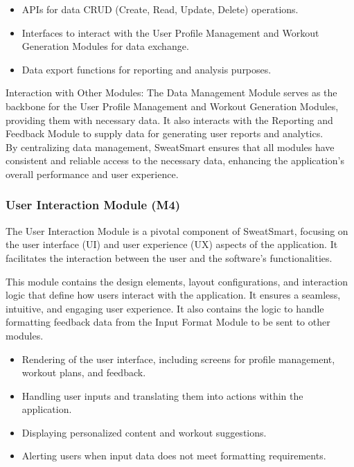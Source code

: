 \documentclass[12pt, titlepage]{article}
\begin{document}
\begin{description}[leftmargin=0pt]
\item[Interfaces:] 
\end{description}
\begin{itemize}[leftmargin=*]
\item APIs for data CRUD (Create, Read, Update, Delete) operations.
\item Interfaces to interact with the User Profile Management and Workout Generation Modules for data exchange.
\item Data export functions for reporting and analysis purposes.
\end{itemize}

Interaction with Other Modules: The Data Management Module serves as the backbone for the User Profile Management and Workout Generation Modules, providing them with necessary data. It also interacts with the Reporting and Feedback Module to supply data for generating user reports and analytics.
\\

By centralizing data management, SweatSmart ensures that all modules have consistent and reliable access to the necessary data, enhancing the application's overall performance and user experience.

\subsubsection{User Interaction Module (M4)}

The User Interaction Module is a pivotal component of SweatSmart, focusing on the user interface (UI) and user experience (UX) aspects of the application. It facilitates the interaction between the user and the software's functionalities.

\begin{description}[leftmargin=0pt]
\item[Secrets:] 
This module contains the design elements, layout configurations, and interaction logic that define how users interact with the application. It ensures a seamless, intuitive, and engaging user experience. It also contains the logic to handle formatting feedback data from the Input Format Module to be sent to other modules.
\end{description}

\begin{description}[leftmargin=0pt]
\item[Services:] 
\end{description}
\begin{itemize}[leftmargin=*]
\item Rendering of the user interface, including screens for profile management, workout plans, and feedback.
\item Handling user inputs and translating them into actions within the application.
\item Displaying personalized content and workout suggestions.
\item Alerting users when input data does not meet formatting requirements.
\end{itemize}
\end{document}
